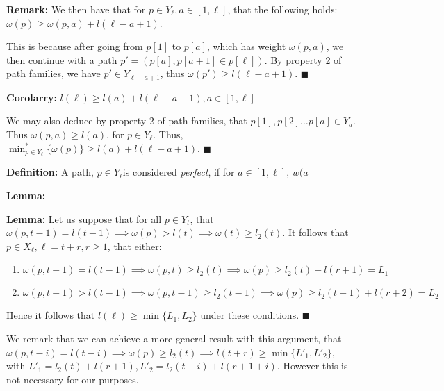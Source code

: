 \documentclass{article}
\newcommand{\edit}[1]{}%
\begin{document}
\textbf{Remark:} We then have that for $p \in Y_\ell, a \in [1,\ell]$, that the following holds: $\omega(p) \geq \omega(p,a)+l(\ell-a+1)$.

This is because after going from $p[1]$ to $p[a]$, which has weight $\omega(p,a)$, we then continue with a path $p' = (p[a], p[a+1] \in p[\ell])$. By property 2 of path families, we have  $p' \in Y_{\ell-a+1}$, thus $\omega(p') \geq l(\ell-a+1)$. $\blacksquare$

\textbf{Corolarry:} $l(\ell) \geq l(a) + l(\ell-a+1), a \in [1,\ell]$

We may also deduce by property 2 of path families, that $p[1], p[2] \dots p[a] \in Y_a$. Thus $\omega(p,a) \geq l(a)$, for $p \in Y_\ell$. Thus, $\min^*_{p\in Y_\ell}\{\omega(p)\} \geq l(a) +l(\ell-a+1)$. $\blacksquare$

\vspace{1.75em}

\textbf{Definition:} A path, $p \in Y_\ell$is considered \textit{perfect}, if for $a \in [1,\ell]$, $w(a$

\textbf{Lemma:}

\vspace{1.75em}

\textbf{Lemma:} Let us suppose that for all $p \in Y_t$, that $\omega(p,t-1) = l(t-1) \implies \omega(p) > l(t) \implies \omega(t) \geq l_2(t)$. It follows that $p \in X_\ell, \ell = t+r, r \geq 1$, that either:

\begin{enumerate}
    \item $\omega(p,t-1) = l(t-1) \implies \omega(p,t) \geq l_2(t) \implies \omega(p) \geq l_2(t) + l(r+1) = L_1$
    \item $\omega(p,t-1) > l(t-1) \implies \omega(p,t-1) \geq l_2(t-1) \implies \omega(p) \geq l_2(t-1)+ l(r+2) = L_2$
\end{enumerate}

Hence it follows that $l(\ell) \geq \min\{L_1,L_2\}$ under these conditions. $\blacksquare$\edit{ clean out the excessive logic; make lemma result more clear}

We remark that we can achieve a more general result with this argument, that $\omega(p,t-i) = l(t-i) \implies \omega(p) \geq l_2(t) \implies l(t+r) \geq \min \{ L'_1, L'_2\}$, with $L'_1 = l_2(t) + l(r+1), L'_2 = l_2(t-i)+l(r+1+i)$. However this is not necessary for our purposes.\edit{ placement; maybe just merge with above}

\vspace{1.75em}
\end{document}
